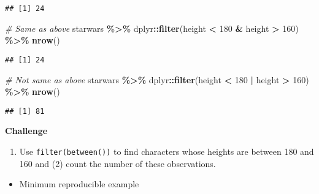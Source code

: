 \documentclass[
]{book}
\newenvironment{Shaded}{\begin{snugshade}}{\end{snugshade}}
\newcommand{\CommentTok}[1]{\textcolor[rgb]{0.56,0.35,0.01}{\textit{#1}}}
\newcommand{\DecValTok}[1]{\textcolor[rgb]{0.00,0.00,0.81}{#1}}
\newcommand{\KeywordTok}[1]{\textcolor[rgb]{0.13,0.29,0.53}{\textbf{#1}}}
\newcommand{\NormalTok}[1]{#1}
\newcommand{\OperatorTok}[1]{\textcolor[rgb]{0.81,0.36,0.00}{\textbf{#1}}}
\newcommand{\StringTok}[1]{\textcolor[rgb]{0.31,0.60,0.02}{#1}}
\providecommand{\tightlist}{%
  \setlength{\itemsep}{0pt}\setlength{\parskip}{0pt}}
\begin{document}
\begin{verbatim}
## [1] 24
\end{verbatim}

\begin{Shaded}
\begin{Highlighting}[]
\CommentTok{\# Same as above}
\NormalTok{starwars }\OperatorTok{\%\textgreater{}\%}
\StringTok{  }\NormalTok{dplyr}\OperatorTok{::}\KeywordTok{filter}\NormalTok{(height }\OperatorTok{\textless{}}\StringTok{ }\DecValTok{180} \OperatorTok{\&}\StringTok{ }\NormalTok{height }\OperatorTok{\textgreater{}}\StringTok{ }\DecValTok{160}\NormalTok{) }\OperatorTok{\%\textgreater{}\%}
\StringTok{  }\KeywordTok{nrow}\NormalTok{()}
\end{Highlighting}
\end{Shaded}

\begin{verbatim}
## [1] 24
\end{verbatim}

\begin{Shaded}
\begin{Highlighting}[]
\CommentTok{\# Not same as above}
\NormalTok{starwars }\OperatorTok{\%\textgreater{}\%}
\StringTok{  }\NormalTok{dplyr}\OperatorTok{::}\KeywordTok{filter}\NormalTok{(height }\OperatorTok{\textless{}}\StringTok{ }\DecValTok{180} \OperatorTok{|}\StringTok{ }\NormalTok{height }\OperatorTok{\textgreater{}}\StringTok{ }\DecValTok{160}\NormalTok{) }\OperatorTok{\%\textgreater{}\%}
\StringTok{  }\KeywordTok{nrow}\NormalTok{()}
\end{Highlighting}
\end{Shaded}

\begin{verbatim}
## [1] 81
\end{verbatim}

\textbf{Challenge}

\begin{enumerate}
\def\labelenumi{(\arabic{enumi})}
\tightlist
\item
  Use \texttt{filter(between())} to find characters whose heights are between 180 and 160 and (2) count the number of these observations.
\end{enumerate}

\begin{itemize}
\tightlist
\item
  Minimum reproducible example
\end{itemize}
\end{document}
